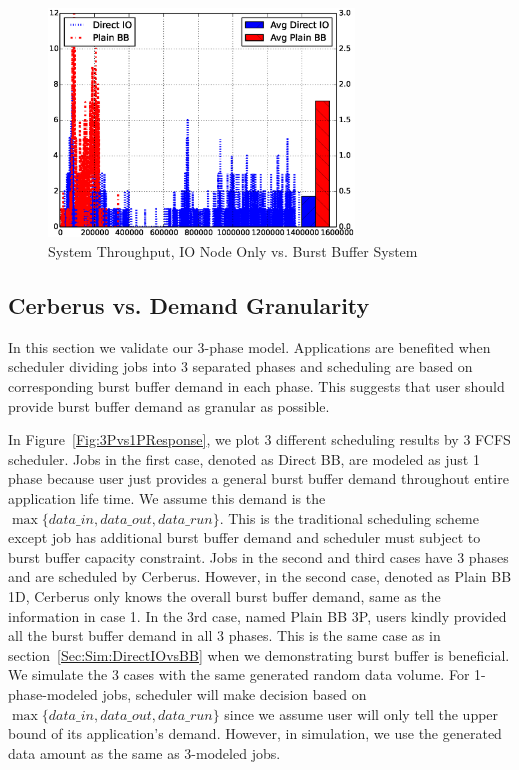 \begin{figure}[!t]
        \centering
        \includegraphics[width=3.2in]{DrawDirectIOvsBB/1000jobs_direct_vs_bb_throughput}
        \caption{System Throughput, IO Node Only vs. Burst Buffer System}
        \label{Fig:DirectIOvsBBThroughput}
\end{figure}


\subsection{Cerberus vs. Demand Granularity}
In this section we validate our 3-phase model.
Applications are benefited when scheduler dividing jobs into 3 separated phases and 
scheduling are based on corresponding burst buffer demand in each phase.
This suggests that user should provide burst buffer demand as granular as possible.

In Figure~\ref{Fig:3Pvs1PResponse}, we plot 3 different scheduling results by 3 FCFS scheduler.
Jobs in the first case, denoted as Direct BB, are modeled as just 1 phase because user just provides
a general burst buffer demand throughout entire application life time.
We assume this demand is the $\max \{data\_in, data\_out, data\_run\}$.
This is the traditional scheduling scheme except job has additional
burst buffer demand and scheduler must subject to burst buffer capacity constraint.
Jobs in the second and third cases have 3 phases and are scheduled by Cerberus.
However, in the second case, denoted as Plain BB 1D, Cerberus only knows the overall burst buffer demand,
same as the information in case 1.
In the 3rd case, named Plain BB 3P, users kindly provided all the burst buffer demand in all 3 phases.
This is the same case as in section~\ref{Sec:Sim:DirectIOvsBB} when we demonstrating burst buffer is beneficial.
We simulate the 3 cases with the same generated random data volume.
For 1-phase-modeled jobs, scheduler will make decision based on $\max \{data\_in, data\_out, data\_run\}$
since we assume user will only tell the upper bound of its application's demand.
However, in simulation, we use the generated data amount as the same as 3-modeled jobs.

